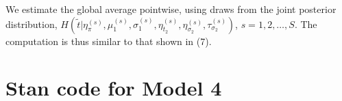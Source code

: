 \documentclass[12pt]{article}
\begin{document}
{We estimate the global average pointwise, using draws from the joint posterior distribution, $H\left(\tilde{t}|\eta_\pi^{(s)}, \mu_1^{(s)}, \sigma_1^{(s)}, \eta_{t_2}^{(s)},\eta_{\sigma_2}^{(s)},\tau_{\sigma_2}^{(s)}\right)$, $s=1,2,\ldots,S$. The computation is thus similar to that shown in (7).
}




\section{Stan code for Model 4}
\label{sec:stan-code}
\end{document}
